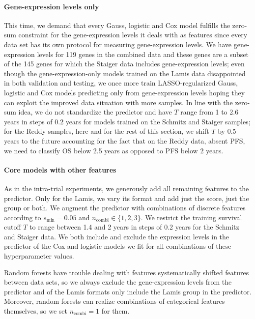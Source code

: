 \paragraph{Gene-expression levels only}
This time, we demand that every Gauss, logistic and Cox model fulfills the zero-sum constraint for 
the gene-expression levels it deals with as features since every data set has its own protocol for 
measuring gene-expression levels. We have gene-expression levels for \num{119} genes in the 
combined data and these genes are a subset of the \num{145} genes for which the Staiger data 
includes gene-expression levels; even though the gene-expression-only models trained on the Lamis 
data disappointed in both validation and testing, we once more train LASSO-regularized Gauss, 
logistic and Cox models predicting only from gene-expression levels hoping they can exploit the 
improved data situation with more samples. In line with the zero-sum idea, we do not standardize 
the predictor and have $T$ range from \num{1} to \num{2.6} years in steps of \num{0.2} years for 
models trained on the Schmitz and Staiger samples; for the Reddy samples, here and for the rest 
of this section, we shift $T$ by
\num{0.5} years to the future accounting for the fact that on the Reddy data, absent PFS, we need 
to classify OS below \num{2.5} years as opposed to PFS below \num{2} years.

\paragraph{Core models with other features}
As in the intra-trial experiments, we generously add all remaining features to the predictor. Only 
for the Lamis, we vary its format and add just the score, just the group or both. We augment the 
predictor with combinations of discrete features according to $s_\text{min} = \num{0.05}$ and 
$n_\text{combi} \in \{ 1, 2, 3 \}$. We restrict the training survival cutoff $T$ to range between 
\num{1.4} and \num{2} years in steps of \num{0.2} years for the Schmitz and Staiger data. We 
both include and exclude the expression levels in the predictor of the Cox and logistic 
models we fit for all combinations of these hyperparameter values.

Random forests have trouble dealing with features systematically shifted features between data sets, so 
we always exclude the gene-expression levels from the predictor and of the Lamis formats only 
include the Lamis group in the predictor. Moreover, random forests can realize combinations of 
categorical features themselves, so we set $n_\text{combi} = 1$ for them.

